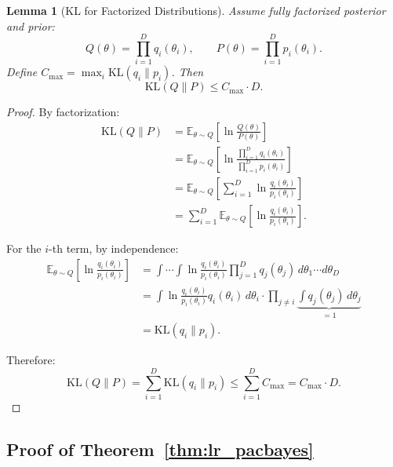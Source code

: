 \documentclass{article}
\theoremstyle{plain}
\newtheorem{lemma}[theorem]{Lemma}
\theoremstyle{definition}
\theoremstyle{remark}
\begin{document}
\begin{lemma}[KL for Factorized Distributions]
\label{lem:kl_factorized}
Assume fully factorized posterior and prior:
\[
Q(\theta) = \prod_{i=1}^{D} q_i(\theta_i), 
\qquad 
P(\theta) = \prod_{i=1}^{D} p_i(\theta_i).
\]
Define $C_{\max} = \max_i \mathrm{KL}(q_i \| p_i)$. Then
\[
\mathrm{KL}(Q \| P) \leq C_{\max} \cdot D.
\]
\end{lemma}

\begin{proof}
By factorization:
\begin{align*}
\mathrm{KL}(Q \| P) 
&= \mathbb{E}_{\theta \sim Q}\left[\ln\frac{Q(\theta)}{P(\theta)}\right] \\
&= \mathbb{E}_{\theta \sim Q}\left[\ln\frac{\prod_{i=1}^{D} q_i(\theta_i)}{\prod_{i=1}^{D} p_i(\theta_i)}\right] \\
&= \mathbb{E}_{\theta \sim Q}\left[\sum_{i=1}^{D} \ln\frac{q_i(\theta_i)}{p_i(\theta_i)}\right] \\
&= \sum_{i=1}^{D} \mathbb{E}_{\theta \sim Q}\left[\ln\frac{q_i(\theta_i)}{p_i(\theta_i)}\right].
\end{align*}

For the $i$-th term, by independence:
\begin{align*}
\mathbb{E}_{\theta \sim Q}\left[\ln\frac{q_i(\theta_i)}{p_i(\theta_i)}\right]
&= \int \cdots \int \ln\frac{q_i(\theta_i)}{p_i(\theta_i)} \prod_{j=1}^{D} q_j(\theta_j) \, d\theta_1 \cdots d\theta_D \\
&= \int \ln\frac{q_i(\theta_i)}{p_i(\theta_i)} q_i(\theta_i) \, d\theta_i 
   \cdot \prod_{j \neq i} \underbrace{\int q_j(\theta_j) \, d\theta_j}_{=1} \\
&= \mathrm{KL}(q_i \| p_i).
\end{align*}

Therefore:
\[
\mathrm{KL}(Q \| P) = \sum_{i=1}^{D} \mathrm{KL}(q_i \| p_i) 
\leq \sum_{i=1}^{D} C_{\max} = C_{\max} \cdot D.
\]
\end{proof}
\subsection{Proof of Theorem~\ref{thm:lr_pacbayes}}\label{app:pacbayes:proof}
\end{document}

